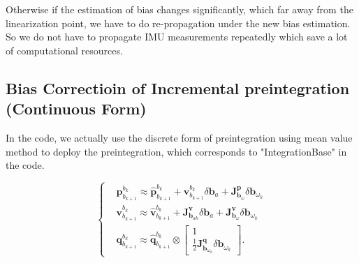 \documentclass[12pt]{report}   %
\begin{document}
Otherwise if the estimation of bias changes significantly, which far away from the linearization point, we have to do re-propagation under the new bias estimation. So we do not have to propagate IMU measurements repeatedly which save a lot of computational resources.



\subsection{Bias Correctioin of Incremental preintegration (Continuous Form)}

In the code, we actually use the discrete form of preintegration using mean value method to deploy the preintegration, 
which corresponds to "IntegrationBase" in the code.

\begin{equation}
	\left\{
	\begin{aligned}
	&\bm{p}_{b_{k+1}}^{b_k}\approx\hat{\bm{p}}_{b_{k+1}}^{b_k}+\bm{v}_{b_{k+1}}^{b_k}\delta\bm{b}_a+\bm{J}^{\bm{p}}_{\bm{b}_\omega}\delta\bm{b}_{\omega_k} \\
	&\bm{v}_{b_{k+1}}^{b_k}\approx\hat{\bm{v}}_{b_{k+1}}^{b_k}+\bm{J}^{\bm{v}}_{\bm{b}_{ak}}\delta\bm{b}_a+\bm{J}^{\bm{v}}_{\bm{b}_\omega}\delta\bm{b}_{\omega_k} \\
	&\bm{q}_{b_{k+1}}^{b_k}\approx\hat{\bm{q}}_{b_{k+1}}^{b_k}\otimes 
		\begin{bmatrix}
			1 \\ \frac{1}{2}\bm{J}^{\bm{q}}_{\bm{b}_{\omega_k}}\delta\bm{b}_{\omega_k}
		\end{bmatrix}.
	\end{aligned}
	\right.
	\label{eq.discrete}
	\end{equation}
\end{document}
